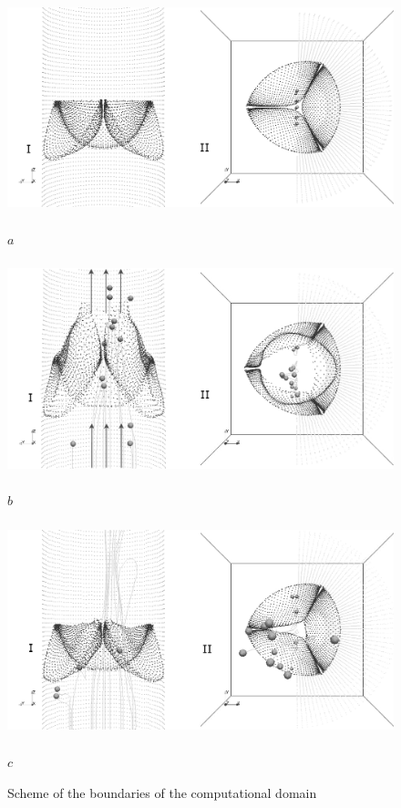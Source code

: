 \documentclass[runningheads,a4paper]{llncs}
\begin{document}
\begin{figure}
\centering
\includegraphics[height=6.2cm]{images/valve_with_particles_1_gray.png}

$a$

\includegraphics[height=6.2cm]{images/valve_with_particles_2_gray.png}

$b$

\includegraphics[height=6.2cm]{images/valve_with_particles_3_gray.png}

$c$

\caption{Scheme of the boundaries of the computational domain}
\label{fig:valve_with_particles_1}
\end{figure}
\end{document}
